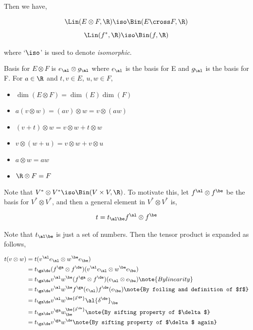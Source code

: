\documentclass{article}
\begin{document}
\begin{center}
\end{center}

Then we have,

\[ \Lin(E \otimes F, \R) \iso \Bin(E \cross F, \R) \]
\[ \Lin(f^*, \R) \iso \Bin(f, \R) \]

where `$\iso$' is used to denote \textit{isomorphic}.


Basis for $E \otimes F$ is $e_\al \otimes g_\al$ where $e_\al$ is the basis for E and $g_\al$ is the basis for F.
For $a \in \R$ and $t, v \in E$, $u, w \in F$,

\begin{itemize}
    \item $\dim(E \otimes F) = \dim(E)\dim(F)$
    \item $a (v \otimes w) = (av) \otimes w = v \otimes (aw)$
    \item $(v + t) \otimes w = v \otimes w + t \otimes w$
    \item $v \otimes (w + u) = v \otimes w + v \otimes u$
    \item $a \otimes w = aw$
    \item $\R \otimes F = F$
\end{itemize}

Note that $V^* \otimes V^* \iso \Bin(V \times V, \R)$. To motivate this, let $f^\al \otimes f^\be$ be the basis for $V^* \otimes V^*$, and then a general element in $V^* \otimes V^*$ is,

\[ t = t_{\al\be} f^\al \otimes f^\be \]

Note that $t_{\al\be}$ is just a set of numbers. Then the tensor product is expanded as follows,

\begin{align*}
    t (v \otimes w) &= t (v^\al e_\al \otimes w^\be e_\be) \\
    &= t_{\ga\de} (f^\ga \otimes f^\de) (v^\al e_\al \otimes w^\be e_\be) \\
    &= t_{\ga\de} v^\al w^\be (f^\ga \otimes f^\de) (e_\al \otimes e_\be) \note{By linearity} \\
    &= t_{\ga\de} v^\al w^\be f^\ga(e_\al) f^\de(e_\be) \note{By foiling and definition of $f$} \\
    &= t_{\ga\de} v^\al w^\be {\delta^\ga}\al {\delta^\de}_\be \\
    &= t_{\ga\de} v^\ga w^\be {\delta^\de}_\be \note{By sifting property of $\delta$}\\
    &= t_{\ga\de} v^\ga w^\de \note{By sifting property of $\delta$ again}
\end{align*}
\end{document}
